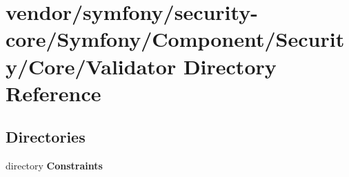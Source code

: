 \section{vendor/symfony/security-\/core/\+Symfony/\+Component/\+Security/\+Core/\+Validator Directory Reference}
\label{dir_1a27de8578c26f5ca1a9a1bf0855f89d}
\subsection*{Directories}
\begin{DoxyCompactItemize}
\item 
directory {\bf Constraints}
\end{DoxyCompactItemize}
